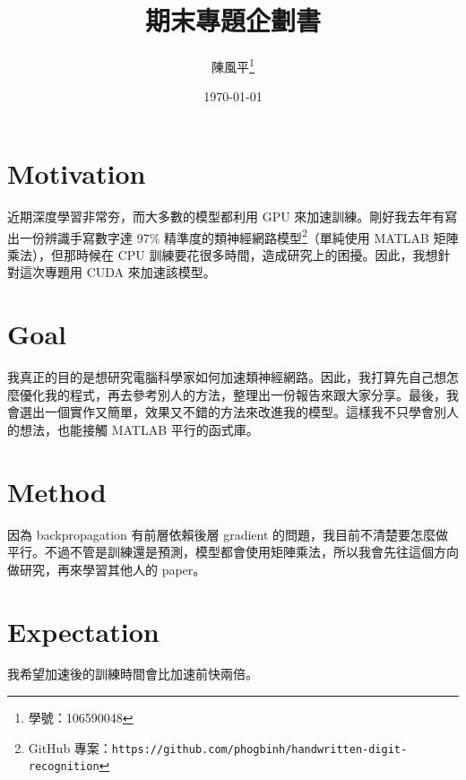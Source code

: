 \documentclass[11pt, letterpaper, oneside]{article}
\title{\textbf{期末專題企劃書}}
\author{陳風平\thanks{學號：106590048}}
\affil{資訊工程系、國立台北科技大學、台北}
\date{\today}
\begin{document}
\maketitle

\section{Motivation}
近期深度學習非常夯，而大多數的模型都利用 GPU 來加速訓練。剛好我去年有寫出一份辨識手寫數字達 97\% 精準度的類神經網路模型\footnote{GitHub 專案：\texttt{https://github.com/phogbinh/handwritten-digit-recognition}}（單純使用 MATLAB 矩陣乘法），但那時候在 CPU 訓練要花很多時間，造成研究上的困擾。因此，我想針對這次專題用 CUDA 來加速該模型。

\section{Goal}
我真正的目的是想研究電腦科學家如何加速類神經網路。因此，我打算先自己想怎麼優化我的程式，再去參考別人的方法，整理出一份報告來跟大家分享。最後，我會選出一個實作又簡單，效果又不錯的方法來改進我的模型。這樣我不只學會別人的想法，也能接觸 MATLAB 平行的函式庫。

\section{Method}
因為 backpropagation 有前層依賴後層 gradient 的問題，我目前不清楚要怎麼做平行。不過不管是訓練還是預測，模型都會使用矩陣乘法，所以我會先往這個方向做研究，再來學習其他人的 paper。

\section{Expectation}
我希望加速後的訓練時間會比加速前快兩倍。
\end{document}
